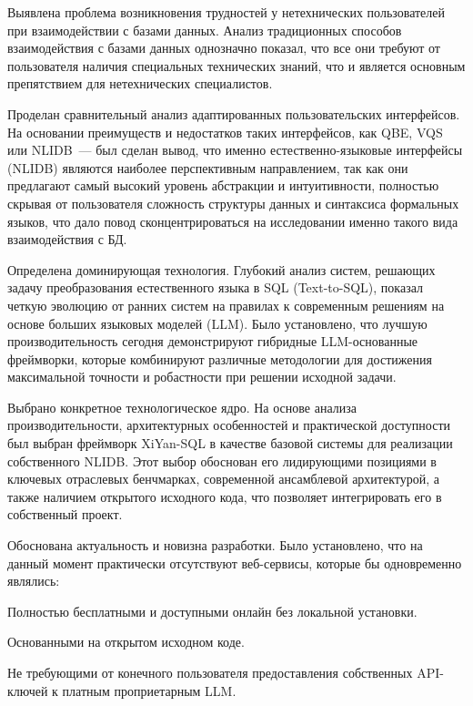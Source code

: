 \begin{compactenum}
	\item Выявлена проблема возникновения трудностей у нетехнических пользователей
	при взаимодействии с базами данных. Анализ традиционных
	способов взаимодействия с базами данных однозначно
	показал, что все они требуют от пользователя наличия специальных технических знаний,
	что и является основным препятствием для нетехнических специалистов.
	\item Проделан сравнительный анализ адаптированных пользовательских
	интерфейсов. На основании преимуществ и недостатков таких интерфейсов, как QBE, VQS или
	NLIDB~--- был сделан вывод,
	что именно естественно-языковые интерфейсы (NLIDB) являются наиболее перспективным направлением,
	так как они предлагают самый высокий уровень абстракции и интуитивности,
	полностью скрывая от пользователя сложность структуры данных и синтаксиса формальных языков,
	что дало повод сконцентрироваться на исследовании именно такого вида взаимодействия с БД.
	\item Определена доминирующая технология. Глубокий анализ систем,
	решающих задачу преобразования естественного языка в SQL (Text-to-SQL),
	показал четкую эволюцию от ранних систем на правилах к современным решениям на
	основе больших языковых моделей (LLM). Было установлено, что лучшую
	производительность сегодня демонстрируют гибридные LLM-основанные фреймворки,
	которые комбинируют различные методологии
	для достижения максимальной точности и робастности при решении исходной задачи.
	\item Выбрано конкретное технологическое ядро. На основе анализа производительности,
	архитектурных особенностей и практической доступности был выбран фреймворк XiYan-SQL
	в качестве базовой системы для реализации собственного NLIDB. Этот выбор обоснован его лидирующими
	позициями в ключевых отраслевых бенчмарках, современной ансамблевой архитектурой,
	а также наличием открытого исходного кода, что позволяет интегрировать его в собственный проект.
	\item Обоснована актуальность и новизна разработки.
	Было установлено, что на данный момент практически отсутствуют веб-сервисы, которые
	бы одновременно являлись:
	\begin{compactitem}
		\item Полностью бесплатными и доступными онлайн без локальной установки.
		\item Основанными на открытом исходном коде.
		\item Не требующими от конечного пользователя предоставления собственных API-ключей
		к платным проприетарным LLM.
	\end{compactitem}
\end{compactenum}

